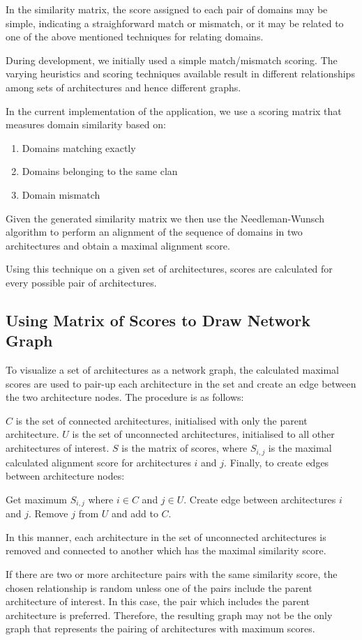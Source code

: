 In the similarity matrix, the score assigned to each pair of domains may be simple, indicating a straighforward match or mismatch, or it may be related to one of the above mentioned techniques for relating domains.

During development, we initially used a simple match/mismatch scoring. The varying heuristics and scoring techniques available result in different relationships among sets of architectures and hence different graphs.

In the current implementation of the application, we use a scoring matrix that measures domain similarity based on:
\begin{enumerate}
	\item Domains matching exactly
	\item Domains belonging to the same clan
	\item Domain mismatch
\end{enumerate}

Given the generated similarity matrix we then use the Needleman-Wunsch algorithm \cite{nwalgo} to perform an alignment of the sequence of domains in two architectures and obtain a maximal alignment score.

Using this technique on a given set of architectures, scores are calculated for every possible pair of architectures.


\subsection{Using Matrix of Scores to Draw Network Graph}

To visualize a set of architectures as a network graph, the calculated maximal scores are used to pair-up each architecture in the set and create an edge between the two architecture nodes. The procedure is as follows:

$C$ is the set of connected architectures, initialised with only the parent architecture. $U$ is the set of unconnected architectures, initialised to all other architectures of interest. $S$ is the matrix of scores, where $S_{i,j}$ is the maximal calculated alignment score for architectures $i$ and $j$. Finally, to create edges between architecture nodes:
\begin{algorithmic}
\STATE Get maximum $S_{i,j}$ where $i \in C$ and $j \in U$.
\STATE Create edge between architectures $i$ and $j$.
\STATE Remove $j$ from $U$ and add to $C$.
\ENDWHILE
\end{algorithmic}
In this manner, each architecture in the set of unconnected architectures is removed and connected to another which has the maximal similarity score.

If there are two or more architecture pairs with the same similarity score, the chosen relationship is random unless one of the pairs include the parent architecture of interest. In this case, the pair which includes the parent architecture is preferred. Therefore, the resulting graph may not be the only graph that represents the pairing of architectures with maximum scores. 






